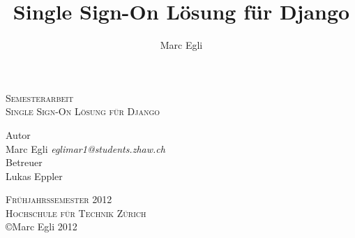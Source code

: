 
\begin{titlepage}
\author{Marc Egli}
\title{Single Sign-On Lösung für Django}
\date{}
\begin{center}

\Large
\textsc{Semesterarbeit}\\



\vspace{0.5cm}
\textsc{Single Sign-On Lösung für Django}
\vspace{1cm}

\large
Autor\\
Marc Egli \textsl{eglimar1@students.zhaw.ch}\\

\vspace{1cm}
Betreuer\\
Lukas Eppler\\
\vspace{1.0cm}




\textsc{Frühjahrssemester 2012}\\
\textsc{Hochschule für Technik Zürich}\\
\vspace{0.5cm}
\normalsize
\copyright Marc Egli 2012

\end{center}

\end{titlepage}
\newpage